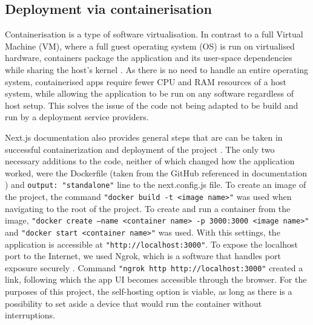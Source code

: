 \subsection{Deployment via containerisation}
Containerisation is a type of software virtualisation. In contrast to a full Virtual Machine (VM), where a full guest operating system (OS) is run on virtualised hardware, containers package the application and its user-space dependencies while sharing the host’s kernel \cite{containerisationArticle1, containerisationArticle2}. As there is no need to handle an entire operating system, containerised apps require fewer CPU and RAM resources of a host system, while allowing the application to be run on any software regardless of host setup. This solves the issue of the code not being adapted to be build and run by a deployment service providers.

Next.js documentation also provides general steps that are can be taken in successful containerization and deployment of the project \cite{vercelMainDeploymentMainPage, nextjs_docker_example}. The only two necessary additions to the code, neither of which changed how the application worked, were the Dockerfile (taken from the GitHub referenced in documentation \cite{nextjs_dockerfile}) and \texttt{output: "standalone"} line to the next.config.js file. To create an image of the project, the command \texttt{"docker build -t <image name>"} was used when navigating to the root of the project. To create and run a container from the image, \texttt{"docker create --name <container name> -p 3000:3000 <image name>"} and \texttt{"docker start <container name>"} was used. With this settings, the application is accessible at \texttt{"http://localhost:3000"}. To expose the localhost port to the Internet, we used Ngrok, which is a software that handles port exposure securely \cite{ngrokMain} \cite{ngrokMainDocs}. Command \texttt{"ngrok http http://localhost:3000"} created a link, following which the app UI becomes accessible through the browser. For the purposes of this project, the self-hosting option is viable, as long as there is a possibility to set aside a device that would run the container without interruptions.

